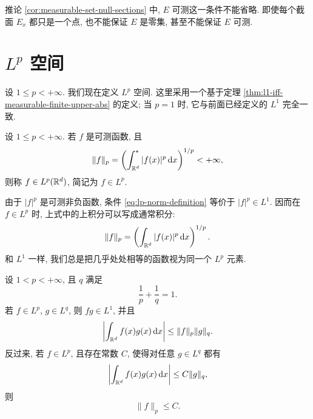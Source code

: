 \begin{rem}
	推论 \ref{cor:measurable-set-null-sections} 中, \(E\) 可测这一条件不能省略. 即使每个截面 \(E_x\) 都只是一个点, 也不能保证 \(E\) 是零集, 甚至不能保证 \(E\) 可测.
\end{rem}

\clearpage

\section{\texorpdfstring{\(L^p\)}{Lp} 空间}
\label{sec:lp-spaces}

设 \(1\leq p<+\infty\). 我们现在定义 \(L^p\) 空间. 这里采用一个基于定理 \ref{thm:l1-iff-measurable-finite-upper-abs} 的定义; 当 \(p=1\) 时, 它与前面已经定义的 \(L^1\) 完全一致.

\begin{defn}[\(L^p\) 空间]
	\label{def:lp-space}
	设 \(1\leq p<+\infty\). 若 \(f\) 是可测函数, 且
	\begin{equation}
		\|f\|_p
		=
		\left(\int_{\mathbb{R}^d}^{*}|f(x)|^p\,\dd x\right)^{1/p}
		<+\infty,
		\label{eq:lp-norm-definition}
	\end{equation}
	则称 \(f\in L^p(\mathbb{R}^d)\), 简记为 \(f\in L^p\).
\end{defn}

由于 \(|f|^p\) 是可测非负函数, 条件 \eqref{eq:lp-norm-definition} 等价于 \(|f|^p\in L^1\). 因而在 \(f\in L^p\) 时, 上式中的上积分可以写成通常积分:
\[
\|f\|_p
=
\left(\int_{\mathbb{R}^d}|f(x)|^p\,\dd x\right)^{1/p}.
\]
和 \(L^1\) 一样, 我们总是把几乎处处相等的函数视为同一个 \(L^p\) 元素.

\begin{thm}
	\label{thm:holder-inequality}
	设 \(1<p<+\infty\), 且 \(q\) 满足
	\[
	\frac1p+\frac1q=1.
	\]
	若 \(f\in L^p\), \(g\in L^q\), 则 \(fg\in L^1\), 并且
	\begin{equation}
		\left|\int_{\mathbb{R}^d}f(x)g(x)\,\dd x\right|
		\leq
		\|f\|_p\|g\|_q.
		\label{eq:holder-inequality}
	\end{equation}
	反过来, 若 \(f\in L^p\), 且存在常数 \(C\), 使得对任意 \(g\in L^q\) 都有
	\begin{equation}
		\left|\int_{\mathbb{R}^d}f(x)g(x)\,\dd x\right|
		\leq C\|g\|_q,
		\label{eq:holder-converse-assumption}
	\end{equation}
	则
	\[
	\|f\|_p\leq C.
	\]
\end{thm}

